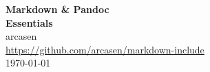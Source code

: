 \begin{titlepage}
  \centering
  \vspace*{3cm}
  {\Huge\textbf{Markdown \& Pandoc\\Essentials}\\}
  \vspace*{1.5cm}
  {\large{arcasen}}\\
  \vspace*{12cm}
  {\large{\url{https://github.com/arcasen/markdown-include}}}\\
  \vspace*{1cm}
  {\normalsize\today}
  \vfill
\end{titlepage}